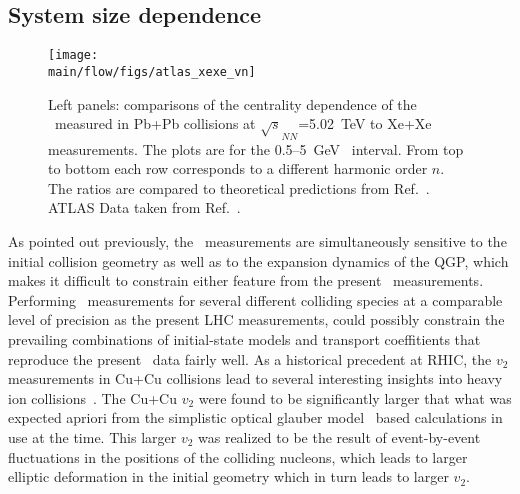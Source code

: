 \subsection{System size dependence}
\label{sec:flow_sizedep}

\begin{figure}[!ht]
\begin{center}
\texttt{[image: \\main/flow/figs/atlas\_xexe\_vn]}
\caption{
Left panels: comparisons of the centrality dependence of the \vn\ measured 
  in Pb+Pb collisions at $\sqrt{s}_{NN}$=5.02~TeV to Xe+Xe measurements. 
The plots are for the 0.5--5~GeV \pT\ interval. 
From top to bottom each row corresponds to a different harmonic order $n$.
The ratios are compared to theoretical predictions from Ref.~\cite{Giacalone:2017dud}.
ATLAS Data taken from Ref.~\cite{ATLAS-CONF-2018-011}.
}
\label{fig:atlas_xexe_vn}
\end{center}
\end{figure}

As pointed out previously, the \vn\ measurements are simultaneously
  sensitive to the initial collision geometry as well as to the 
  expansion dynamics of the QGP, which makes it difficult to 
  constrain either feature from the present \vn\ measurements.
Performing \vn\ measurements for several different colliding species
  at a comparable level of precision as the present LHC measurements,  
  could possibly constrain the prevailing combinations of initial-state 
  models and transport coeffitients that reproduce the present \vn\ data 
  fairly well.
As a historical precedent at RHIC, the $v_2$ measurements in Cu+Cu 
  collisions lead to several interesting insights into heavy ion 
  collisions~\cite{RHIC_CU_CU}.
The Cu+Cu $v_2$ were found to be significantly larger that what was 
  expected apriori from the simplistic optical glauber model~\cite{OPTICAL_GLAUBER}
  based calculations in use at the time.
This larger $v_2$ was realized to be the result of event-by-event fluctuations
  in the positions of the colliding nucleons, which leads to larger
  elliptic deformation in the initial geometry which in turn leads 
  to larger $v_2$.


